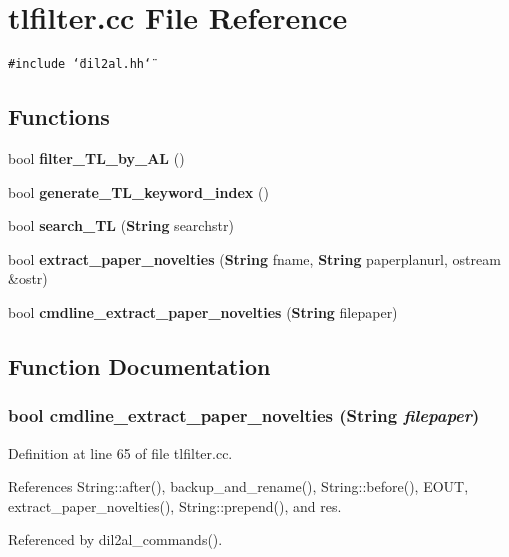 \section{tlfilter.cc File Reference}
\label{tlfilter_8cc}
{\tt \#include \char`\"{}dil2al.hh\char`\"{}}\par
\subsection*{Functions}
\begin{CompactItemize}
\item 
bool {\bf filter\_\-TL\_\-by\_\-AL} ()
\item 
bool {\bf generate\_\-TL\_\-keyword\_\-index} ()
\item 
bool {\bf search\_\-TL} ({\bf String} searchstr)
\item 
bool {\bf extract\_\-paper\_\-novelties} ({\bf String} fname, {\bf String} paperplanurl, ostream \&ostr)
\item 
bool {\bf cmdline\_\-extract\_\-paper\_\-novelties} ({\bf String} filepaper)
\end{CompactItemize}


\subsection{Function Documentation}
\subsubsection{\setlength{\rightskip}{0pt plus 5cm}bool cmdline\_\-extract\_\-paper\_\-novelties ({\bf String} {\em filepaper})}\label{tlfilter_8cc_a4}




Definition at line 65 of file tlfilter.cc.

References String::after(), backup\_\-and\_\-rename(), String::before(), EOUT, extract\_\-paper\_\-novelties(), String::prepend(), and res.

Referenced by dil2al\_\-commands().



